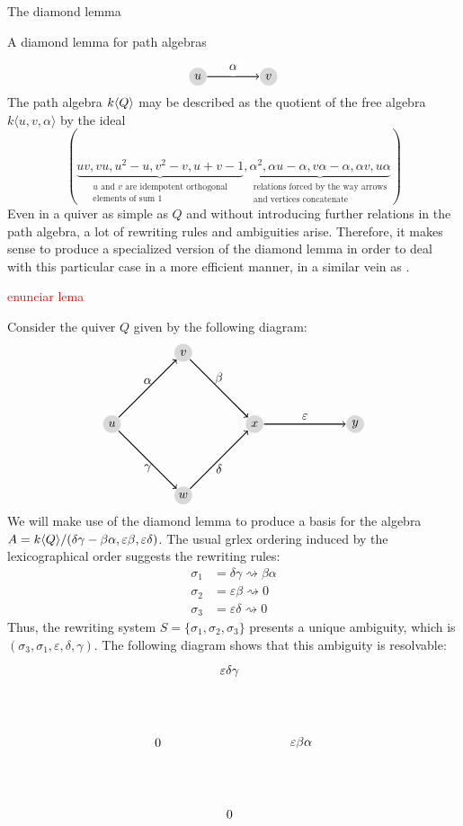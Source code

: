 \begin{chapter}{The diamond lemma}
\begin{section}{A diamond lemma for path algebras}
\[
\begin{tikzpicture}[->,node distance=1cm, thick]
\tikzstyle{every node} = [circle, fill=gray!30, minimum size=.5cm, inner sep=.07cm]
\node (1) at (0,0) {$u$};
\node (2) at (2,0) {$v$};
\draw (1) -- (2) node[midway, above, fill=white] {$\alpha$};
\end{tikzpicture}
\]
The path algebra $k\langle Q\rangle$ may be described as the quotient of the free algebra $k\langle u,v,\alpha\rangle$ by the ideal
\[(\underbrace{uv, vu, u^2-u, v^2-v, u+v-1}_{\substack{\text{$u$ and $v$ are idempotent orthogonal}\\\text{elements of sum $1$}}}, \underbrace{\alpha^2, \alpha u-\alpha, v\alpha-\alpha, \alpha v,u\alpha }_{\substack{\text{relations forced by the way arrows}\\\text{and vertices concatenate}}})\]
Even in a quiver as simple as $Q$ and without introducing further relations in the path algebra, a lot of rewriting rules and ambiguities arise. Therefore, it makes sense to produce a specialized version of the diamond lemma in order to deal with this particular case in a more efficient manner, in a similar vein as \cite{FFG93}.

\textcolor{red}{enunciar lema}

\begin{exmp} Consider the quiver $Q$ given by the following diagram:
\[
\begin{tikzpicture}[->,node distance=1cm, thick]
\tikzstyle{every node} = [circle, fill=gray!30, minimum size=.5cm, inner sep=.07cm]
\node (1) at (0,0) {$u$};
\node (2) at (2,2) {$v$};
\node (3) at (2,-2) {$w$};
\node (4) at (4,0) {$x$};
\node (5) at (6.82,0) {$y$};
\tikzstyle{every node} = []
\draw (1) -- (2) node[midway, above] {$\alpha$};
\draw (2) -- (4) node[midway, above] {$\beta$};
\draw (1) -- (3) node[midway, below] {$\gamma$};
\draw (3) -- (4) node[midway, below] {$\delta$};
\draw (4) -- (5) node[midway, above] {$\varepsilon$};
\end{tikzpicture}
\]
We will make use of the diamond lemma to produce a basis for the algebra $A=k\langle Q\rangle/(\delta\gamma-\beta\alpha, \varepsilon\beta, \varepsilon\delta)$. The usual grlex ordering induced by the lexicographical order suggests the rewriting rules:
\begin{align*}
\sigma_1 &= \delta\gamma \rightsquigarrow \beta\alpha\\
\sigma_2 &= \varepsilon\beta \rightsquigarrow 0\\
\sigma_3 &= \varepsilon\delta \rightsquigarrow 0
\end{align*}
Thus, the rewriting system $S=\{\sigma_1,\sigma_2,\sigma_3\}$ presents a unique ambiguity, which is $(\sigma_3,\sigma_1, \varepsilon,\delta,\gamma)$. The following diagram shows that this ambiguity is resolvable:
\[
\begin{tikzpicture}
\node (1) at (0,0) {$\varepsilon\delta\gamma$};
\node (a1) at (-2,-2) {$0$};
\node (a2) at (2,-2) {$\varepsilon\beta\alpha$};
\node (b) at (0,-4) {$0$};


\end{tikzpicture}\]
\end{exmp}
\end{section}
\end{chapter}
